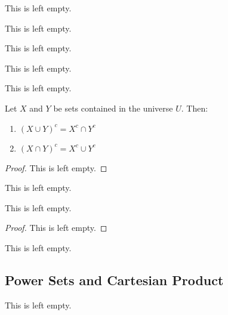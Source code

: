 \begin{definition}
    This is left empty.
\end{definition}

\begin{proposition}
    This is left empty.
\end{proposition}

\begin{definition}
    This is left empty.
\end{definition}

\begin{proposition}
    This is left empty.
\end{proposition}

\begin{remark}
    This is left empty.
\end{remark}

\begin{theorem} Let $X$ and $Y$ be sets contained in the universe $U$. Then:
    \label{thm:demorganslaws}
    \begin{enumerate}
        \item $(X \cup Y)^c = X^c \cap Y^c$
        \item $(X \cap Y)^c = X^c \cup Y^c$
    \end{enumerate}
    \begin{proof}
        This is left empty.
    \end{proof}
\end{theorem}

\begin{definition}[Difference]
    This is left empty.
\end{definition}

\begin{proposition}
    This is left empty.
    \begin{proof}
        This is left empty.
    \end{proof}
\end{proposition}

\begin{definition}
    This is left empty.
\end{definition}

\subsection{Power Sets and Cartesian Product}

\begin{definition}
    This is left empty.
\end{definition}

